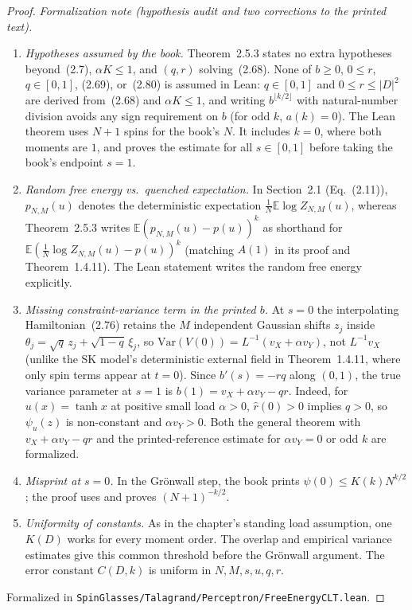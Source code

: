 \begin{proof}
\emph{Formalization note (hypothesis audit and two corrections to the printed text).}
\begin{enumerate}
\item \emph{Hypotheses assumed by the book.} Theorem~2.5.3 states no extra hypotheses beyond~(2.7), $\alpha K\le 1$,
and $(q,r)$ solving~(2.68). None of $b\ge 0$, $0\le r$, $q\in[0,1]$, (2.69), or~(2.80) is assumed in Lean:
$q\in[0,1]$ and $0\le r\le|D|^2$ are derived from~(2.68) and $\alpha K\le 1$, and writing $b^{\lfloor k/2\rfloor}$
with natural-number division avoids any sign requirement on $b$ (for odd $k$, $a(k)=0$).
The Lean theorem uses $N+1$ spins for the book's $N$. It includes $k=0$, where both moments are $1$,
and proves the estimate for all $s\in[0,1]$ before taking the book's endpoint $s=1$.
\item \emph{Random free energy vs.\ quenched expectation.} In Section~2.1 (Eq.~(2.11)), $p_{N,M}(u)$ denotes the
deterministic expectation $\frac1N\mathbb E\log Z_{N,M}(u)$, whereas Theorem~2.5.3 writes $\mathbb E(p_{N,M}(u)-p(u))^k$
as shorthand for $\mathbb E(\frac1N\log Z_{N,M}(u)-p(u))^k$ (matching $A(1)$ in its proof and Theorem~1.4.11).
The Lean statement writes the random free energy explicitly.
\item \emph{Missing constraint-variance term in the printed $b$.} At $s=0$ the interpolating Hamiltonian~(2.76)
retains the $M$ independent Gaussian shifts $z_j$ inside $\theta_j=\sqrt q\,z_j+\sqrt{1-q}\,\xi_j$, so
$\mathrm{Var}(V(0))=L^{-1}(v_X+\alpha v_Y)$, not $L^{-1}v_X$ (unlike the SK model's deterministic external field in
Theorem~1.4.11, where only spin terms appear at $t=0$). Since $b'(s)=-rq$ along $(0,1)$, the true variance parameter
at $s=1$ is $b(1)=v_X+\alpha v_Y-qr$. Indeed, for $u(x)=\tanh x$ at positive small load $\alpha>0$, $\widehat r(0)>0$
implies $q>0$, so $\psi_u(z)$ is non-constant and $\alpha v_Y>0$. Both the general theorem with $v_X+\alpha v_Y-qr$
and the printed-reference estimate for $\alpha v_Y=0$ or odd $k$ are formalized.
\item \emph{Misprint at $s=0$.} In the Gr\"onwall step, the book prints $\psi(0)\le K(k)N^{k/2}$; the proof uses and
proves $(N+1)^{-k/2}$.
\item \emph{Uniformity of constants.} As in the chapter's standing load assumption, one $K(D)$ works
for every moment order. The overlap and empirical variance estimates give this common threshold
before the Gr\"onwall argument. The error constant $C(D,k)$ is uniform in $N,M,s,u,q,r$.
\end{enumerate}
Formalized in \texttt{SpinGlasses/Talagrand/Perceptron/FreeEnergyCLT.lean}.
\end{proof}

